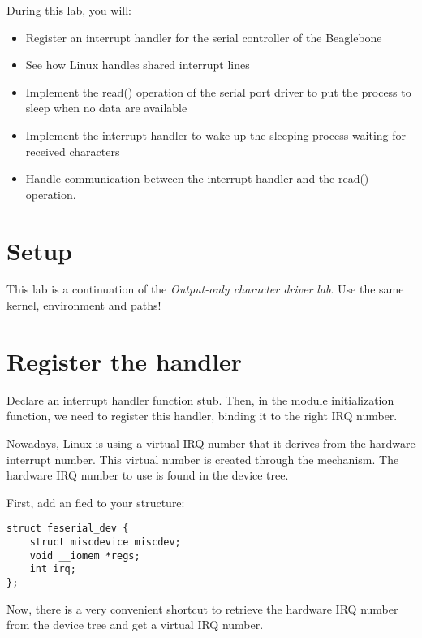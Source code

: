 
During this lab, you will:

\begin{itemize}
\item Register an interrupt handler for the serial controller of the
  Beaglebone
\item See how Linux handles shared interrupt lines
\item Implement the read() operation of the serial port driver to put
  the process to sleep when no data are available
\item Implement the interrupt handler to wake-up the sleeping process
  waiting for received characters
\item Handle communication between the interrupt handler and the
  read() operation.
\end{itemize}

\section{Setup}

This lab is a continuation of the {\em Output-only character driver
lab}. Use the same kernel, environment and paths!

\section{Register the handler}

Declare an interrupt handler function stub. Then, in the module
initialization function, we need to register this handler, binding
it to the right IRQ number.

Nowadays, Linux is using a virtual IRQ number that it derives from the
hardware interrupt number. This virtual number is created through the
 mechanism. The hardware IRQ number to use is found in
the device tree.

First, add an  fied to your  structure:

\begin{verbatim}
struct feserial_dev {
	struct miscdevice miscdev;
	void __iomem *regs;
	int irq;
};
\end{verbatim}

Now, there is a very convenient shortcut to retrieve the
hardware IRQ number from the device tree and get a virtual IRQ number.

